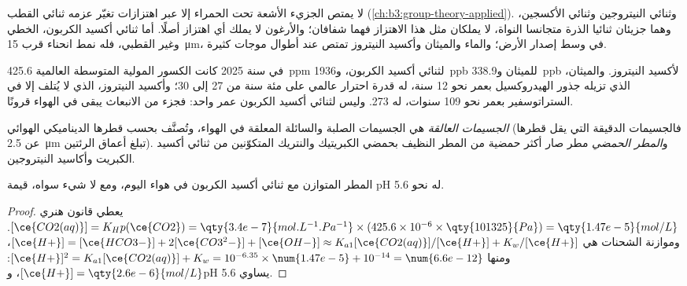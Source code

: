 لا يمتص الجزيء الأشعة تحت الحمراء إلا عبر اهتزازات تغيّر
عزمه ثنائي القطب (\cref{ch:b3:group-theory-applied}). وثنائي النيتروجين وثنائي الأكسجين،
وهما جزيئان ثنائيا الذرة متجانسا النواة، لا يملكان مثل هذا الاهتزاز فهما شفافان؛ والأرغون لا يملك
أي اهتزاز أصلًا. أما ثنائي أكسيد الكربون، الخطي وغير القطبي، فله نمط انحناء
 قرب \qty{15}{\micro\metre}، في وسط إصدار الأرض؛ والماء والميثان
وأكسيد النيتروز تمتص عند أطوال موجات كثيرة.

في سنة 2025 كانت الكسور المولية المتوسطة العالمية \qty{425.6}{ppm} لثنائي أكسيد الكربون، و\qty{1936}{ppb}
للميثان و\qty{338.9}{ppb} لأكسيد النيتروز. والميثان، الذي تزيله جذور الهيدروكسيل
بعمر نحو 12 سنة، له قدرة احترار عالمي على مئة سنة من 27 إلى 30؛ وأكسيد النيتروز، الذي لا يُتلف إلا في
الستراتوسفير بعمر نحو 109 سنوات، له 273. وليس لثنائي أكسيد الكربون
عمر واحد: فجزء من الانبعاث يبقى في الهواء قرونًا.

\begin{definition}\label{def:b3:environmental-toxicology:pollutants}
\emph{الجسيمات العالقة} هي الجسيمات الصلبة والسائلة
المعلقة في الهواء، وتُصنَّف بحسب قطرها الديناميكي الهوائي (فالجسيمات الدقيقة
التي يقل قطرها عن \qty{2.5}{\micro\metre} تبلغ أعماق الرئتين). و\emph{المطر
الحمضي} مطر صار أكثر حمضية من المطر النظيف بحمضي الكبريتيك
والنتريك المتكوّنين من ثنائي أكسيد الكبريت وأكاسيد النيتروجين.
\end{definition}

\begin{proposition}\label{prop:b3:environmental-toxicology:rain-ph}
المطر المتوازن مع ثنائي أكسيد الكربون في هواء اليوم، ومع لا شيء
سواه، قيمة pH له نحو 5.6.
\end{proposition}

\begin{proof}
يعطي قانون هنري $[\ce{CO2(aq)}] = K_Hp(\ce{CO2}) = \qty{3.4e-7}{mol.L^{-1}.Pa^{-1}} \times (425.6 \times 10^{-6} \times \qty{101325}{Pa}) = \qty{1.47e-5}{mol/L}$. 
وموازنة الشحنات هي $[\ce{H+}] = [\ce{HCO3-}] + 2[\ce{CO3^2-}] + [\ce{OH-}] \approx K_{a1}[\ce{CO2(aq)}]/[\ce{H+}] + K_w/[\ce{H+}]$، ومنها
$[\ce{H+}]^2 = K_{a1}[\ce{CO2(aq)}] + K_w = 10^{-6.35} \times \num{1.47e-5} + 10^{-14} = \num{6.6e-12}$: $[\ce{H+}] = \qty{2.6e-6}{mol/L}$، وpH يساوي 5.6.
\end{proof}

